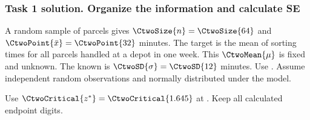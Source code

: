 \subsubsection*{Task 1 solution. Organize the information and calculate SE}
\label{sol:c2-advanced-c-a}
A random sample of  parcels gives $\CtwoSize{n}=\CtwoSize{64}$ and  $\CtwoPoint{\bar{x}}=\CtwoPoint{32}$ minutes. The target is the mean of sorting times for all parcels handled at a depot in one week. This  $\CtwoMean{\mu}$ is fixed and unknown. The known  is $\CtwoSD{\sigma}=\CtwoSD{12}$ minutes. Use  . Assume independent random observations and normally distributed  under the model.

Use $\CtwoCritical{z^*}=\CtwoCritical{1.645}$ at . Keep all calculated endpoint digits.

